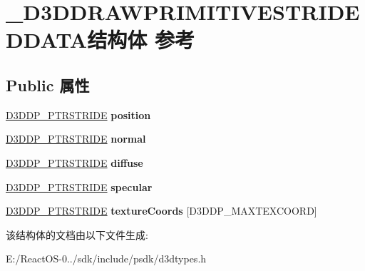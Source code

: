 \hypertarget{struct___d3_d_d_r_a_w_p_r_i_m_i_t_i_v_e_s_t_r_i_d_e_d_d_a_t_a}{}\section{\+\_\+\+D3\+D\+D\+R\+A\+W\+P\+R\+I\+M\+I\+T\+I\+V\+E\+S\+T\+R\+I\+D\+E\+D\+D\+A\+T\+A结构体 参考}
\label{struct___d3_d_d_r_a_w_p_r_i_m_i_t_i_v_e_s_t_r_i_d_e_d_d_a_t_a}
\subsection*{Public 属性}
\begin{DoxyCompactItemize}
\item 
\mbox{\label{struct___d3_d_d_r_a_w_p_r_i_m_i_t_i_v_e_s_t_r_i_d_e_d_d_a_t_a_a16dc4435f470ef72bd628251c200d7ee}} 
\hyperlink{struct___d3_d_d_p___p_t_r_s_t_r_i_d_e}{D3\+D\+D\+P\+\_\+\+P\+T\+R\+S\+T\+R\+I\+DE} {\bfseries position}
\item 
\mbox{\label{struct___d3_d_d_r_a_w_p_r_i_m_i_t_i_v_e_s_t_r_i_d_e_d_d_a_t_a_aca1033b36829fad9e6a82546b714bc63}} 
\hyperlink{struct___d3_d_d_p___p_t_r_s_t_r_i_d_e}{D3\+D\+D\+P\+\_\+\+P\+T\+R\+S\+T\+R\+I\+DE} {\bfseries normal}
\item 
\mbox{\label{struct___d3_d_d_r_a_w_p_r_i_m_i_t_i_v_e_s_t_r_i_d_e_d_d_a_t_a_a1af5d61e5080f4c46129268f898dfc36}} 
\hyperlink{struct___d3_d_d_p___p_t_r_s_t_r_i_d_e}{D3\+D\+D\+P\+\_\+\+P\+T\+R\+S\+T\+R\+I\+DE} {\bfseries diffuse}
\item 
\mbox{\label{struct___d3_d_d_r_a_w_p_r_i_m_i_t_i_v_e_s_t_r_i_d_e_d_d_a_t_a_a999001ba0bb44fe551cc50a3bd5710b3}} 
\hyperlink{struct___d3_d_d_p___p_t_r_s_t_r_i_d_e}{D3\+D\+D\+P\+\_\+\+P\+T\+R\+S\+T\+R\+I\+DE} {\bfseries specular}
\item 
\mbox{\label{struct___d3_d_d_r_a_w_p_r_i_m_i_t_i_v_e_s_t_r_i_d_e_d_d_a_t_a_a1dfb8c46b1c9ea0478fe4e1e806771ee}} 
\hyperlink{struct___d3_d_d_p___p_t_r_s_t_r_i_d_e}{D3\+D\+D\+P\+\_\+\+P\+T\+R\+S\+T\+R\+I\+DE} {\bfseries texture\+Coords} \mbox{[}D3\+D\+D\+P\+\_\+\+M\+A\+X\+T\+E\+X\+C\+O\+O\+RD\mbox{]}
\end{DoxyCompactItemize}


该结构体的文档由以下文件生成\+:\begin{DoxyCompactItemize}
\item 
E\+:/\+React\+O\+S-\/0../sdk/include/psdk/d3dtypes.\+h\end{DoxyCompactItemize}
